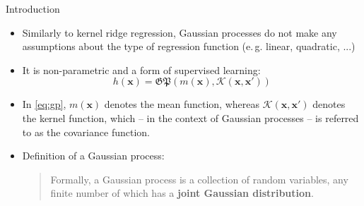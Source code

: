 \begin{dwHeaderFrame}{Introduction}
	\begin{itemize}
		\item Similarly to kernel ridge regression, Gaussian processes do not make any assumptions about the type of regression function (e.\,g. linear, quadratic, ...)
		\item It is non-parametric and a form of supervised learning:
		\begin{equation}
			h(\bm{x}) = \mathfrak{GP}(m(\bm{x}), \mathcal{K}(\bm{x}, \bm{x}'))
			\label{eq:gp}
		\end{equation}
		\item In \cref{eq:gp}, $m(\bm{x})$ denotes the mean function, whereas $\mathcal{K}(\bm{x}, \bm{x}')$ denotes the kernel function, which -- in the context of Gaussian processes -- is
			referred to as the covariance function.
		\item Definition of a Gaussian process:
		\begin{quote}
			Formally, a Gaussian process is a collection of random variables, any finite number of which has a \textbf{joint Gaussian distribution}.
		\end{quote}
	\end{itemize}
\end{dwHeaderFrame}


